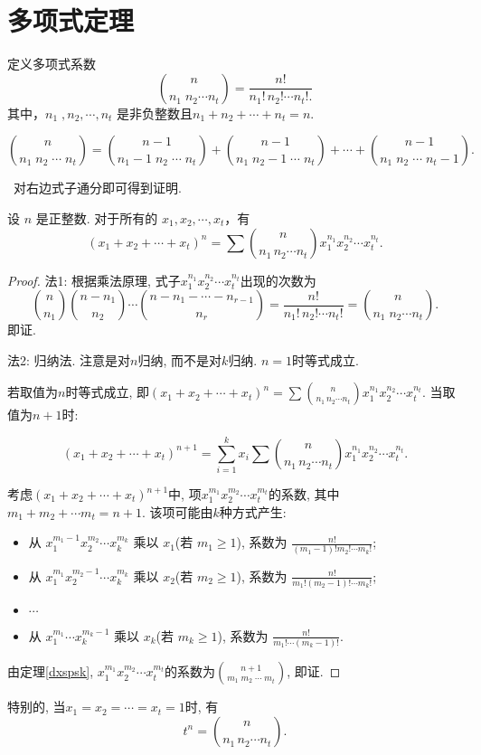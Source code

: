 \section{多项式定理} 
定义多项式系数
\[
\binom{n}{n_1\; n_2 \cdots n_t} = \frac{n!}{n_1! \, n_2! \cdots n_t!.}
\]
其中，\( n_1\;, n_2, \cdots, n_t \) 是非负整数且$n_1 + n_2 + \cdots + n_t = n$.

\begin{theorem}[多项式系数的帕斯卡公式]\label{dxspsk}
    $$\binom{n}{n_1 \; n_2 \; \cdots \; n_t} = \binom{n-1}{n_1-1 \; n_2 \; \cdots \; n_t} + \binom{n-1}{n_1 \; n_2-1 \; \cdots \; n_t} + \cdots + \binom{n-1}{n_1 \; n_2 \; \cdots \; n_t-1}.$$
\end{theorem}\
对右边式子通分即可得到证明.

\begin{theorem}[多项式定理]
    设 \( n \) 是正整数.  对于所有的 \( x_1, x_2, \cdots, x_t \)，有
\[
(x_1 + x_2 + \cdots + x_t)^n = \sum \binom{n}{n_1 \, n_2 \cdots n_t} x_1^{n_1} x_2^{n_2} \cdots x_t^{n_t}.
\]
\end{theorem}
\begin{proof}
    法1: 根据乘法原理, 式子$x_1^{n_1} x_2^{n_2} \cdots x_t^{n_t}$出现的次数为
    $$\binom{n}{n_1} \binom{n-n_1}{n_2} \cdots \binom{n-n_1-\cdots-n_{r-1}}{n_r}=\frac{n!}{n_1! \, n_2! \cdots n_t!}=\binom{n}{n_1\; n_2 \cdots n_t}.$$即证.

    法2: 归纳法. 注意是对$n$归纳, 而不是对$k$归纳. $n=1$时等式成立.

    若取值为$n$时等式成立, 即$(x_1 + x_2 + \cdots + x_t)^n = \sum \binom{n}{n_1 \, n_2 \cdots n_t} x_1^{n_1} x_2^{n_2} \cdots x_t^{n_t}.$ 当取值为$n+1$时:

    $$(x_1 + x_2 + \cdots + x_t)^{n+1} = \sum_{i=1}^{k}x_i  \sum \binom{n}{n_1 \, n_2 \cdots n_t} x_1^{n_1} x_2^{n_2} \cdots x_t^{n_t}.$$

    考虑$(x_1 + x_2 + \cdots + x_t)^{n+1}$中, 项$x_1^{m_1} x_2^{m_2} \cdots x_t^{m_t}$的系数, 其中$m_1+m_2+\cdots m_t=n+1$. 该项可能由$k$种方式产生:

    \begin{itemize}
        \item 从 \( x_1^{m_1 - 1} x_2^{m_2} \cdots x_k^{m_k} \) 乘以 \( x_1 \)(若 \( m_1 \geq 1 \)), 系数为 \( \frac{n!}{(m_1 - 1)! m_2! \cdots m_k!} \);
        \item 从 \( x_1^{m_1} x_2^{m_2 - 1} \cdots x_k^{m_k} \) 乘以 \( x_2 \)(若 \( m_2 \geq 1 \)), 系数为 \( \frac{n!}{m_1! (m_2 - 1)! \cdots m_k!} \);
        \item \(\cdots\)
        \item 从 \( x_1^{m_1} \cdots x_k^{m_k - 1} \) 乘以 \( x_k \)(若 \( m_k \geq 1 \)), 系数为 \( \frac{n!}{m_1! \cdots (m_k - 1)!} \).

    \end{itemize}

    由定理\ref{dxspsk}, $x_1^{m_1} x_2^{m_2} \cdots x_t^{m_t}$的系数为$\binom{n+1}{m_1 \; m_2 \; \cdots \; m_t}$, 即证.

\end{proof} 

特别的, 当$x_1=x_2=\cdots=x_t=1$时, 有
$$t^n=\binom{n}{n_1 \, n_2 \cdots n_t}.$$
